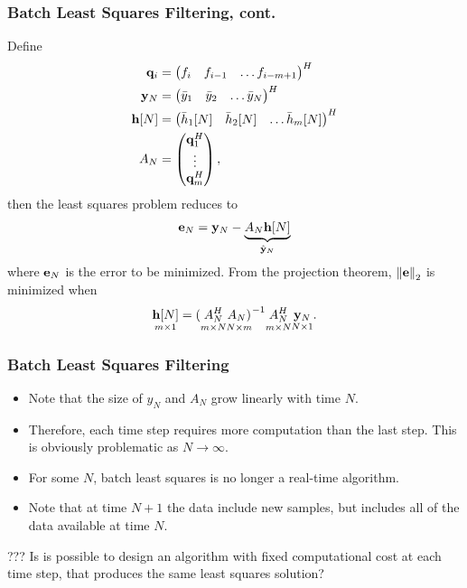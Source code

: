 \documentclass{beamer}
\begin{document}
\begin{frame}\frametitle{Batch Least Squares Filtering, cont.}
	Define
	\begin{align*}
		\mathbf{q}_i &= \begin{pmatrix} f_i & f_{i-1} & \dots f_{i-m+1} \end{pmatrix}^H \\
		\mathbf{y}_N &= \begin{pmatrix} \bar{y}_1 & \bar{y}_2 & \dots \bar{y}_N \end{pmatrix}^H \\
		\mathbf{h}[N] &= \begin{pmatrix} \bar{h}_1[N] & \bar{h}_2[N] & \dots \bar{h}_m[N] \end{pmatrix}^H \\
		A_N &= \begin{pmatrix} \mathbf{q}^H_1 \\ \vdots \\ \mathbf{q}^H_m \end{pmatrix},
	\end{align*}
	then the least squares problem reduces to
	\[ 
		\mathbf{e}_N = \mathbf{y}_N - \underbrace{A_N \mathbf{h}[N]}_{\hat{\mathbf{y}}_N}
	\] 
	where $\mathbf{e}_N$ is the error to be minimized.  From the projection theorem, $\left\|\mathbf{e}\right\|_2$ is minimized when
	\[
		\underset{m\times 1}{\mathbf{h}[N]} = (\underset{m \times N}{A^H_N} \underset{N \times m}{A_N)}^{-1}\underset{m\times N}{A^H_N}\underset{N\times 1}{\mathbf{y}_N}. 
	\]
\end{frame}

\begin{frame}\frametitle{Batch Least Squares Filtering}
	\begin{itemize}
		\item Note that the size of $y_N$ and $A_N$ grow linearly with time $N$.  
		\item Therefore, each time step requires more computation than the last step.  This is obviously problematic as $N\to\infty$.  
		\item For some $N$, batch least squares is no longer a real-time algorithm.
		\item Note that at time $N+1$ the data include new samples, but includes all of the data available at time $N$.
	\end{itemize}
	
	\vspace{1cm}
	
	{\color{red} ???  Is is possible to design an algorithm with fixed computational cost at each time step, that produces the same least squares solution?}
\end{frame}
\end{document}
